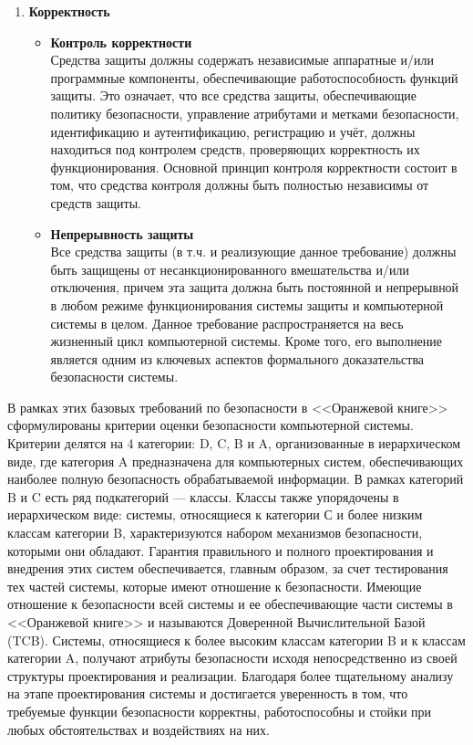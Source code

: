\begin{enumerate}
\begin{itemize}
		на безопасность, для сокращения накладных расходов на дальнейший аудит и повышения эффективности анализа. Подлежащие аудиту данные должны быть надежно защищены от несанкционированного
		доступа, модификации и уничтожения.
	\end{itemize}
	\item \textbf{Корректность}
	\begin{itemize}
		\item \textbf{Контроль корректности}\\
		Средства защиты должны содержать независимые аппаратные и/или программные компоненты, обеспечивающие работоспособность функций защиты. Это означает, что все средства защиты,
		обеспечивающие политику безопасности, управление атрибутами и метками безопасности, идентификацию и аутентификацию, регистрацию и учёт, должны находиться под контролем средств,
		проверяющих корректность их функционирования. Основной принцип контроля корректности состоит в том, что средства контроля должны быть полностью независимы от средств защиты.
		\item \textbf{Непрерывность защиты}\\
		Все средства защиты (в т.ч. и реализующие данное требование) должны быть защищены от несанкционированного вмешательства и/или отключения, причем эта защита должна быть постоянной
		и непрерывной в любом режиме функционирования системы защиты и компьютерной системы в целом. Данное требование распространяется на весь жизненный цикл компьютерной системы.
		Кроме того, его выполнение является одним из ключевых аспектов формального доказательства безопасности системы.
	\end{itemize}
\end{enumerate}

В рамках этих базовых требований по безопасности в <<Оранжевой книге>> сформулированы критерии оценки безопасности компьютерной системы. Критерии делятся на 4 категории: D, C, B и A,
организованные в иерархическом виде, где категория A предназначена для компьютерных систем, обеспечивающих наиболее полную безопасность обрабатываемой информации. В рамках категорий B и C
есть ряд подкатегорий --- классы. Классы также упорядочены в иерархическом виде: системы, относящиеся к категории С и более низким классам категории B, характеризуются набором механизмов
безопасности, которыми они обладают. Гарантия правильного и полного проектирования и внедрения этих систем обеспечивается, главным образом, за счет тестирования тех частей системы,
которые имеют отношение к безопасности. Имеющие отношение к безопасности всей системы и ее обеспечивающие части системы в <<Оранжевой книге>> и называются Доверенной Вычислительной Базой (TCB).
Системы, относящиеся к более высоким классам категории B и к классам категории A, получают атрибуты безопасности исходя непосредственно из своей структуры проектирования и реализации.
Благодаря более тщательному анализу на этапе проектирования системы и достигается уверенность в том, что требуемые функции безопасности корректны, работоспособны и стойки при
любых обстоятельствах и воздействиях на них.

